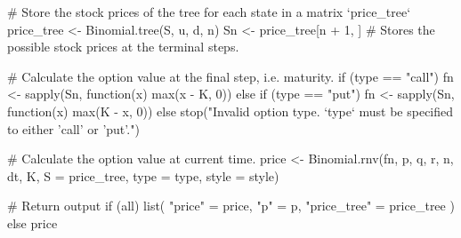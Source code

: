 \begin{Rminted}
{    # Store the stock prices of the tree for each state in a matrix `price_tree`
    price_tree <- Binomial.tree(S, u, d, n)
    Sn <- price_tree[n + 1, ] # Stores the possible stock prices at the terminal steps.

    # Calculate the option value at the final step, i.e. maturity.
    if (type == "call") {
        fn <- sapply(Sn, function(x) {max(x - K, 0)})
    } else if (type == "put") {
        fn <- sapply(Sn, function(x) {max(K - x, 0)})
    } else {
        stop("Invalid option type. `type` must be specified to either 'call' or 'put'.")
    }

    # Calculate the option value at current time.
    price <- Binomial.rnv(fn, p, q, r, n, dt, K, S = price_tree, type = type, style = style)

    # Return output
    if (all) {
        list(
            "price" = price,
            "p" = p,
            "price_tree" = price_tree
        )
    } else {
        price
    }
}
\end{Rminted}

\newpage